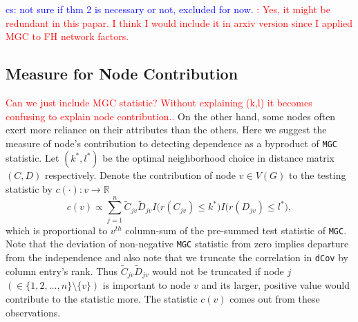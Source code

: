 \documentclass[11pt]{article}
\theoremstyle{definition}
\newcommand{\cs}[1]{\textcolor{blue}{cs: #1}}
\begin{document}

\cs{not sure if thm 2 is necessary or not, excluded for now.} \textcolor{red}{: Yes, it might be redundant in this papar. I think I would include it in arxiv version since I applied MGC to FH network factors.}

\subsection{Measure for Node Contribution}
\textcolor{red}{Can we just include MGC statistic? Without explaining (k,l) it becomes confusing to explain node contribution..}
On the other hand, some nodes often exert more reliance on their attributes than the others. Here we suggest the measure of node's contribution to detecting dependence as a byproduct of \texttt{MGC} statistic. Let $(k^{*}, l^{*})$ be the optimal neighborhood choice in distance matrix $(C, D)$ respectively. Denote the contribution of node $v \in V(G)$ to the testing statistic by  $c(\cdot) : v \rightarrow \mathbb{R}$
\begin{equation}
\label{eq:contribution}
c(v) \propto \sum\limits_{j=1}^{n} \tilde{C}_{j v} \tilde{D}_{j v} I \big(  r (C_{j v}) \leq k^{*}  \big) I \big( r (D_{ j v }) \leq l^{*} \big), 
\end{equation}
which is proportional to $v^{th}$ column-sum of the pre-summed test statistic of \texttt{MGC}. Note that the deviation of non-negative \texttt{MGC} statistic from zero implies departure from the independence and also note that we truncate the correlation in \texttt{dCov} by column entry's rank. Thus $\tilde{C}_{jv} \tilde{D}_{jv}$ would not be truncated if node $j$ $(\in \{ 1,2, \ldots, n \} \setminus \{v \} )$ is important to node $v$ and its larger, positive value would contribute to the statistic more. The statistic $c(v)$ comes out from these observations. 

\end{document}
